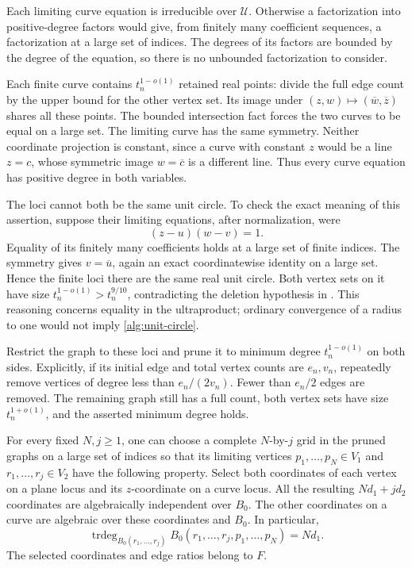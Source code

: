 Each limiting curve equation is irreducible over \(\mathcal U\).
Otherwise a factorization into positive-degree factors would give, from
finitely many coefficient sequences, a factorization at a large set of
indices. The degrees of its factors are bounded by the degree of the
equation, so there is no unbounded factorization to consider.

Each finite curve contains \(t_n^{1-o(1)}\) retained real points: divide
the full edge count by the upper bound for the other vertex set. Its
image under \((z,w)\mapsto(\overline w,\overline z)\) shares all these
points. The bounded intersection fact forces the two curves to be equal
on a large set. The limiting curve has the same symmetry. Neither
coordinate projection is constant, since a curve with constant \(z\)
would be a line \(z=c\), whose symmetric image \(w=\overline c\) is a
different line. Thus every curve equation has positive degree in both
variables.

The loci cannot both be the same unit circle. To check the exact meaning
of this assertion, suppose their limiting equations, after normalization,
were
\begin{equation}\label{alg:unit-circle}
 (z-u)(w-v)=1.
\end{equation}
Equality of its finitely many coefficients holds at a large set of
finite indices. The symmetry gives \(v=\overline u\), again an exact
coordinatewise identity on a large set. Hence the finite loci there are
the same real unit circle. Both vertex sets on it have size
\(t_n^{1-o(1)}>t_n^{9/10}\), contradicting the deletion hypothesis in
. This reasoning concerns equality in the
ultraproduct; ordinary convergence of a radius to one would not imply
\eqref{alg:unit-circle}.

Restrict the graph to these loci and prune it to minimum degree
\(t_n^{1-o(1)}\) on both sides. Explicitly, if its initial edge and total
vertex counts are \(e_n,v_n\), repeatedly remove vertices of degree less
than \(e_n/(2v_n)\). Fewer than \(e_n/2\) edges are removed. The
remaining graph still has a full count, both vertex sets have size
\(t_n^{1+o(1)}\), and the asserted minimum degree holds.

\begin{lemma}
\label{alg:generic-grid}
For every fixed \(N,j\ge1\), one can choose a complete
\(N\)-by-\(j\) grid in the pruned graphs on a large set of indices
so that its limiting vertices
\(p_1,\ldots,p_N\in V_1\) and \(r_1,\ldots,r_j\in V_2\) have the
following property. Select both coordinates of each vertex on a plane
locus and its \(z\)-coordinate on a curve locus. All the resulting
\(Nd_1+jd_2\) coordinates are algebraically independent over \(B_0\).
The other coordinates on a curve are algebraic over these coordinates
and \(B_0\). In particular,
\begin{equation}\label{alg:joint-degree}
 \operatorname{trdeg}_{B_0(r_1,\ldots,r_j)}
       B_0(r_1,\ldots,r_j,p_1,\ldots,p_N)=Nd_1.
\end{equation}
The selected coordinates and edge ratios belong to \(F\).
\end{lemma}

